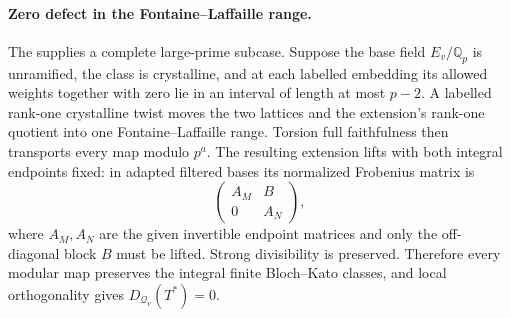 \paragraph{Zero defect in the Fontaine--Laffaille range.}
The  supplies a complete large-prime subcase. Suppose the base
field \(E_v/\mathbb Q_p\) is unramified, the class is crystalline,
and at each labelled embedding its allowed weights together with
zero lie in an interval of length at most \(p-2\).
A labelled rank-one crystalline twist moves the two lattices and
the extension's rank-one quotient into one Fontaine--Laffaille range.
Torsion full faithfulness then transports every map modulo \(p^a\).
The resulting extension lifts with both integral endpoints fixed:
in adapted filtered bases its normalized Frobenius matrix is
\[
 \begin{pmatrix}A_M&B\\0&A_N\end{pmatrix},
\]
where \(A_M,A_N\) are the given invertible endpoint matrices and
only the off-diagonal block \(B\) must be lifted. Strong divisibility
is preserved. Therefore every modular map preserves the integral
finite Bloch--Kato classes, and local orthogonality gives
\(D_{\mathcal Q_v}(T^*)=0\).

